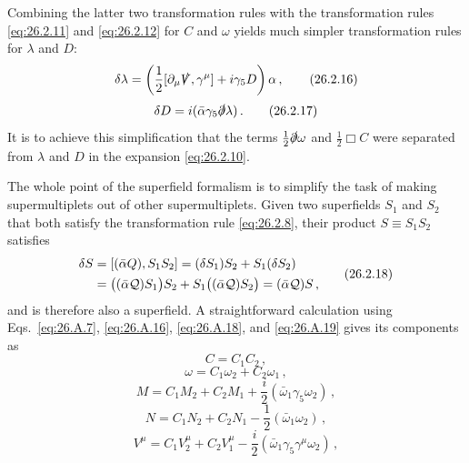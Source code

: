 Combining the latter two transformation rules with the transformation rules
\eqref{eq:26.2.11} and \eqref{eq:26.2.12} for $C$ and $\omega$ yields much
simpler transformation rules for $\lambda$ and $D$:
\begin{equation}
  \delta\lambda
  =\left(\frac12[\partial_\mu\sl{V},\gamma^\mu]
    +i\gamma_5D\right)\alpha\,,
  \tag{26.2.16}\label{eq:26.2.16}
\end{equation}
\begin{equation}
  \delta D=i(\bar\alpha\gamma_5\sl{\partial}\lambda)\,.
  \tag{26.2.17}\label{eq:26.2.17}
\end{equation}
It is to achieve this simplification that the terms
$\frac12\sl{\partial}\omega$ and $\frac12\Box C$ were separated from
$\lambda$ and $D$ in the expansion \eqref{eq:26.2.10}.

The whole point of the superfield formalism is to simplify the task of making
supermultiplets out of other supermultiplets. Given two superfields $S_1$ and
$S_2$ that both satisfy the transformation rule \eqref{eq:26.2.8}, their
product $S\equiv S_1S_2$ satisfies
\begin{equation}
  \begin{aligned}
  \delta S&=[(\bar\alpha Q),S_1S_2]
  =(\delta S_1)S_2+S_1(\delta S_2)\\
  &=\bigl((\bar\alpha\SuperQ)S_1\bigr)S_2
    +S_1\bigl((\bar\alpha\SuperQ)S_2\bigr)
  =(\bar\alpha\SuperQ)S\,,
  \end{aligned}
  \tag{26.2.18}\label{eq:26.2.18}
\end{equation}
and is therefore also a superfield. A straightforward calculation using
Eqs.~\eqref{eq:26.A.7}, \eqref{eq:26.A.16}, \eqref{eq:26.A.18}, and
\eqref{eq:26.A.19} gives its components as
\begin{equation}
  C=C_1C_2\,,
  \tag{26.2.19}\label{eq:26.2.19}
\end{equation}
\begin{equation}
  \omega=C_1\omega_2+C_2\omega_1\,,
  \tag{26.2.20}\label{eq:26.2.20}
\end{equation}
\begin{equation}
  M=C_1M_2+C_2M_1+\frac{i}{2}(\bar\omega_1\gamma_5\omega_2)\,,
  \tag{26.2.21}\label{eq:26.2.21}
\end{equation}
\begin{equation}
  N=C_1N_2+C_2N_1-\frac12(\bar\omega_1\omega_2)\,,
  \tag{26.2.22}\label{eq:26.2.22}
\end{equation}
\begin{equation}
  V^\mu=C_1V_2^\mu+C_2V_1^\mu
  -\frac{i}{2}(\bar\omega_1\gamma_5\gamma^\mu\omega_2)\,,
  \tag{26.2.23}\label{eq:26.2.23}
\end{equation}

